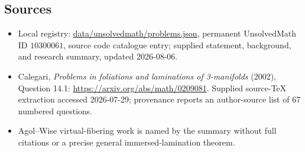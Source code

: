 \documentclass[11pt]{article}
\begin{document}
\subsection{Sources}
\begin{itemize}
\item Local registry: \url{data/unsolvedmath/problems.json}, permanent UnsolvedMath ID \(10300061\), source code catalogue entry; supplied statement, background, and research summary, updated 2026-08-06.
\item Calegari, \emph{Problems in foliations and laminations of 3-manifolds} (2002), Question 14.1: \url{https://arxiv.org/abs/math/0209081}. Supplied source-TeX extraction accessed 2026-07-29; provenance reports an author-source list of 67 numbered questions.
\item Agol--Wise virtual-fibering work is named by the summary without full citations or a precise general immersed-lamination theorem.
\end{itemize}
\end{document}
